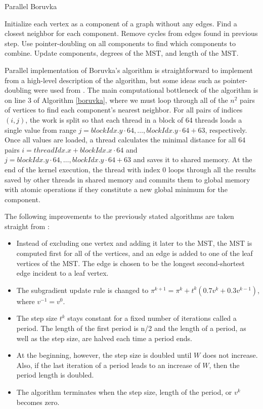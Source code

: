 \documentclass[english, 12pt, a4paper, sci, utf8, a-1b, online]{aaltothesis}
\begin{document}
\begin{algorithm}[H]
	\caption{Parallel Boruvka} 
	\begin{algorithmic}[1]
		\State Initialize each vertex as a component of a graph without any edges.
	    		\State Find a closest neighbor for each component.
	    		\State Remove cycles from edges found in previous step.
	    		\State Use pointer-doubling on all components to find which components to combine.
	    		\State Update components, degrees of the MST, and length of the MST.
	    \EndWhile
	\end{algorithmic} 
	\label{boruvka}
\end{algorithm}
Parallel implementation of Boruvka's algorithm is straightforward to implement from a high-level description of the algorithm, but some ideas such as pointer-doubling were used from \cite{gpumst}. The main computational bottleneck of the algorithm is on line 3 of Algorithm \ref{boruvka}, where we must loop through all of the $n^2$ pairs of vertices to find each component's nearest neighbor. For all pairs of indices $(i, j)$, the work is split so that each thread in a block of 64 threads loads a single value from range $j = blockIdx.y \cdot 64, \ldots, blockIdx.y \cdot 64 + 63$, respectively. Once all values are loaded, a thread calculates the minimal distance for all 64 pairs $i = threadIdx.x + blockIdx.x \cdot 64$ and $j = blockIdx.y \cdot 64, \ldots, blockIdx.y \cdot 64 + 63$ and saves it to shared memory. At the end of the kernel execution, the thread with index 0 loops through all the results saved by other threads in shared memory and commits them to global memory with atomic operations if they constitute a new global minimum for the component.

The following improvements to the previously stated algorithms are taken straight from \cite{HELSGAUN2000106}:
\begin{itemize}
	\item Instead of excluding one vertex and adding it later to the MST, the MST is computed first for all of the vertices, and an edge is added to one of the leaf vertices of the MST. The edge is chosen to be the longest second-shortest edge incident to a leaf vertex.
	\item The subgradient update rule is changed to $\pi^{k+1} = \pi^k + t^k(0.7 v^k + 0.3 v^{k-1})$, where $v^{-1} = v^0$.
	\item The step size $t^k$ stays constant for a fixed number of iterations called a period. The length of the first period is n/2 and the length of a period, as well as the step size, are halved each time a period ends.
	\item At the beginning, however, the step size is doubled until $W$ does not increase. Also, if the last iteration of a period leads to an increase of $W$, then the period length is doubled.
	\item The algorithm terminates when the step size, length of the period, or $v^k$ becomes zero.
\end{itemize}
\end{document}
